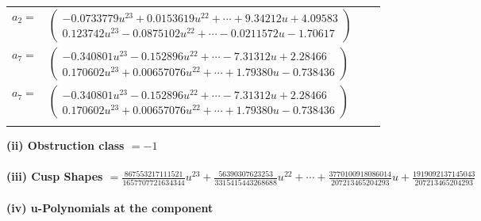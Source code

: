 \documentclass[1p]{elsarticle_modified}
\theoremstyle{definition}
\begin{document}
\begin{tabular}{m{7pt} m{180pt} m{7pt} m{180pt} }
\flushright $a_{2}=$&$\begin{pmatrix}-0.0733779 u^{23}+0.0153619 u^{22}+\cdots+9.34212 u+4.09583\\0.123742 u^{23}-0.0875102 u^{22}+\cdots-0.0211572 u-1.70617\end{pmatrix}$ \\
\flushright $a_{7}=$&$\begin{pmatrix}-0.340801 u^{23}-0.152896 u^{22}+\cdots-7.31312 u+2.28466\\0.170602 u^{23}+0.00657076 u^{22}+\cdots+1.79380 u-0.738436\end{pmatrix}$\\ \flushright $a_{7}=$&$\begin{pmatrix}-0.340801 u^{23}-0.152896 u^{22}+\cdots-7.31312 u+2.28466\\0.170602 u^{23}+0.00657076 u^{22}+\cdots+1.79380 u-0.738436\end{pmatrix}$\\&\end{tabular}
\flushleft \textbf{(ii) Obstruction class $= -1$}\\~\\
\flushleft \textbf{(iii) Cusp Shapes $= \frac{867553217111521}{1657707721634344} u^{23}+\frac{56390307623253}{3315415443268688} u^{22}+\cdots+\frac{3770100918086014}{207213465204293} u+\frac{1919092137145043}{207213465204293}$}\\~\\
\newpage\renewcommand{\arraystretch}{1}
\flushleft \textbf{(iv) u-Polynomials at the component}\newline \\
\end{document}
